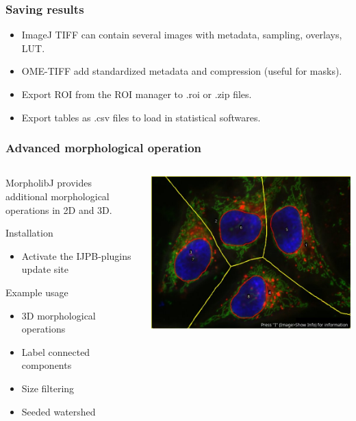 \documentclass[ignorenonframetext,aspectratio=169,10pt,xcolor=table]{beamer}
\begin{document}
\begin{frame} \frametitle{Saving results}
  \begin{itemize} \setlength\itemsep{2em}
  \item ImageJ TIFF can contain several images with metadata, sampling, overlays, LUT.
  \item OME-TIFF add standardized metadata and compression (useful for masks).
  \item Export ROI from the ROI manager to .roi or .zip files.
  \item Export tables as .csv files to load in statistical softwares.
  \end{itemize}
\end{frame}


\begin{frame} \frametitle{Advanced morphological operation}
  \begin{columns}
    \begin{column}{0.65\textwidth}
  MorpholibJ provides additional morphological operations in 2D and 3D.
  \begin{block}{Installation}
    \begin{itemize}
    \item Activate the IJPB-plugins update site
    \end{itemize}
  \end{block}
  \begin{block}{Example usage}
    \begin{itemize}
      \item 3D morphological operations
      \item Label connected components
      \item Size filtering
      \item Seeded watershed
      \end{itemize}
  \end{block}
\end{column}
\begin{column}{0.35\textwidth}
  \includegraphics[width=\textwidth]{seeded_watershed}
\end{column}
\end{columns}
\end{frame}
\end{document}
